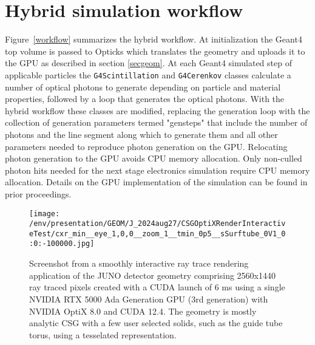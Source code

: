 \documentclass{webofc}
\begin{document}
\section{Hybrid simulation workflow}%
\label{secworkflow}%
%
Figure~\ref{workflow} summarizes the hybrid workflow. 
At initialization the Geant4 top volume is passed to Opticks
which translates the geometry and uploads it to the GPU as described in section \ref{secgeom}.
%
At each Geant4 simulated step of applicable particles the {\tt G4Scintillation} and {\tt G4Cerenkov} classes 
calculate a number of optical photons to generate depending on particle and material properties, 
followed by a loop that generates the optical photons. 
With the hybrid workflow these classes are modified, replacing the generation loop with the collection of 
generation parameters termed "gensteps" that include the number of photons and the line segment along which to generate them and all
other parameters needed to reproduce photon generation on the GPU. Relocating photon generation to the
GPU avoids CPU memory allocation. Only non-culled photon hits needed for the next stage electronics 
simulation require CPU memory allocation. Details on the GPU implementation of the simulation 
can be found in prior proceedings\cite{chep2023}. 
%
%
%
\begin{figure}
\centering
\texttt{[image: /env/presentation/GEOM/J\_2024aug27/CSGOptiXRenderInteractiveTest/cxr\_min\_\_eye\_1,0,0\_\_zoom\_1\_\_tmin\_0p5\_\_sSurftube\_0V1\_0:0:-100000.jpg]}
\caption{Screenshot from a smoothly interactive ray trace rendering application of the JUNO detector geometry comprising 2560x1440 ray traced pixels created with a CUDA launch of 6 ms
using a single NVIDIA RTX 5000 Ada Generation GPU (3rd generation) with NVIDIA OptiX 8.0 and CUDA 12.4.
The geometry is mostly analytic CSG with a few user selected solids, such as the guide tube torus, using a tesselated representation.  
}    
\label{interactive}
\vspace{-5mm}
\end{figure}
%
%
\end{document}
